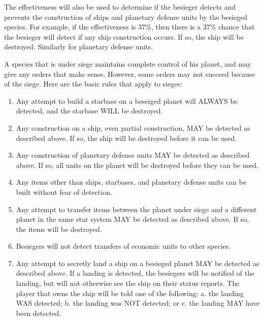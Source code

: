 \documentclass[10pt,titlepage]{article}
\begin{document}
The effectiveness will also be used to determine if the besieger detects and
prevents the construction of ships and planetary defense units by the besieged
species.  For example, if the effectiveness is 37\%, then there is a 37\% chance
that the besieger will detect if any ship construction occurs.  If so, the ship
will be destroyed.  Similarly for planetary defense units.

A species that is under siege maintains complete control of his planet, and may
give any orders that make sense.  However, some orders may not succeed because
of the siege.  Here are the basic rules that apply to sieges:

\begin{enumerate}
 \item Any attempt to build a starbase on a beseiged planet will ALWAYS
	be detected, and the starbase WILL be destroyed.

	\item Any construction on a ship, even partial construction, MAY be
	detected as described above.  If so, the ship will be destroyed
	before it can be used.

	\item Any construction of planetary defense units MAY be detected as
	described above.  If so, all units on the planet will be destroyed
	before they can be used.

     \item Any items other than ships, starbases, and planetary defense units
	can be built without fear of detection.

	\item Any attempt to transfer items between the planet under siege and a
	different planet in the same star system MAY be detected as described
	above.  If so, the items will be destroyed.

	\item Besiegers will not detect transfers of economic units to other
	species.

	\item Any attempt to secretly land a ship on a besieged planet MAY
	be detected as described above.  If a landing is detected, the
	besiegers will be notified of the landing, but will not otherwise
	see the ship on their status reports.  The player that owns the
	ship will be told one of the following:  a. the landing WAS detected;
	b. the landing was NOT detected;  or c. the landing MAY have been
	detected.
\end{enumerate}
\end{document}
